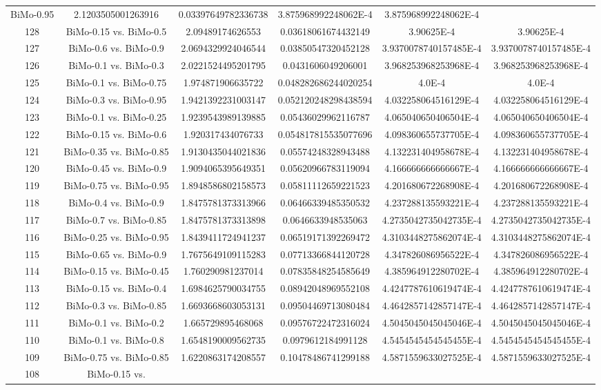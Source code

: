\documentclass[a4paper,10pt]{article}
\begin{document}
\begin{landscape}
\begin{table}[!htp]
\begin{tabular}{cccccc}
BiMo-0.95&2.1203505001263916&0.03397649782336738&3.875968992248062E-4&3.875968992248062E-4\\128&BiMo-0.15 vs. BiMo-0.5&2.09489174626553&0.03618061674432149&3.90625E-4&3.90625E-4\\127&BiMo-0.6 vs. BiMo-0.9&2.0694329924046544&0.03850547320452128&3.9370078740157485E-4&3.9370078740157485E-4\\126&BiMo-0.1 vs. BiMo-0.3&2.0221524495201795&0.0431606049206001&3.968253968253968E-4&3.968253968253968E-4\\125&BiMo-0.1 vs. BiMo-0.75&1.974871906635722&0.048282686244020254&4.0E-4&4.0E-4\\124&BiMo-0.3 vs. BiMo-0.95&1.9421392231003147&0.052120248298438594&4.032258064516129E-4&4.032258064516129E-4\\123&BiMo-0.1 vs. BiMo-0.25&1.9239543989139885&0.05436029962116787&4.065040650406504E-4&4.065040650406504E-4\\122&BiMo-0.15 vs. BiMo-0.6&1.920317434076733&0.054817815535077696&4.098360655737705E-4&4.098360655737705E-4\\121&BiMo-0.35 vs. BiMo-0.85&1.9130435044021836&0.05574248328943488&4.132231404958678E-4&4.132231404958678E-4\\120&BiMo-0.45 vs. BiMo-0.9&1.9094065395649351&0.05620966783119094&4.166666666666667E-4&4.166666666666667E-4\\119&BiMo-0.75 vs. BiMo-0.95&1.8948586802158573&0.05811112659221523&4.201680672268908E-4&4.201680672268908E-4\\118&BiMo-0.4 vs. BiMo-0.9&1.8475781373313966&0.06466339485350532&4.237288135593221E-4&4.237288135593221E-4\\117&BiMo-0.7 vs. BiMo-0.85&1.8475781373313898&0.0646633948535063&4.2735042735042735E-4&4.2735042735042735E-4\\116&BiMo-0.25 vs. BiMo-0.95&1.8439411724941237&0.06519171392269472&4.3103448275862074E-4&4.3103448275862074E-4\\115&BiMo-0.65 vs. BiMo-0.9&1.7675649109115283&0.07713366844120728&4.347826086956522E-4&4.347826086956522E-4\\114&BiMo-0.15 vs. BiMo-0.45&1.760290981237014&0.07835848254585649&4.385964912280702E-4&4.385964912280702E-4\\113&BiMo-0.15 vs. BiMo-0.4&1.6984625790034755&0.08942048969552108&4.4247787610619474E-4&4.4247787610619474E-4\\112&BiMo-0.3 vs. BiMo-0.85&1.6693668603053131&0.09504469713080484&4.4642857142857147E-4&4.4642857142857147E-4\\111&BiMo-0.1 vs. BiMo-0.2&1.665729895468068&0.09576722472316024&4.5045045045045046E-4&4.5045045045045046E-4\\110&BiMo-0.1 vs. BiMo-0.8&1.6548190009562735&0.0979612184991128&4.5454545454545455E-4&4.5454545454545455E-4\\109&BiMo-0.75 vs. BiMo-0.85&1.6220863174208557&0.10478486741299188&4.5871559633027525E-4&4.5871559633027525E-4\\108&BiMo-0.15 vs. 
\end{tabular}
\end{table}
\end{landscape}
\end{document}
